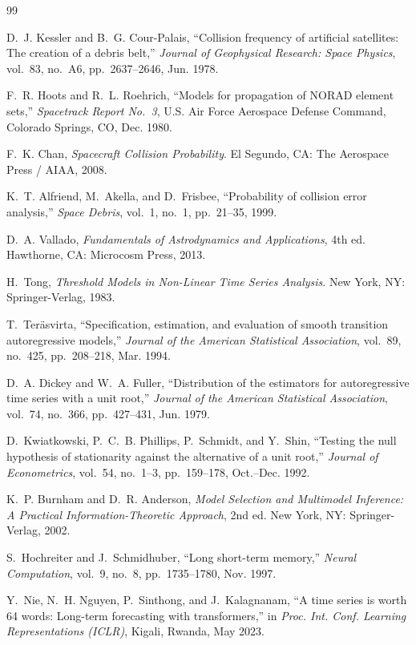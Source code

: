 \documentclass[conference]{IEEEtran}
\begin{document}
\begin{thebibliography}{99}

D.~J. Kessler and B.~G. Cour-Palais,
``Collision frequency of artificial satellites: The creation of a debris belt,''
\textit{Journal of Geophysical Research: Space Physics},
vol.~83, no.~A6, pp.~2637--2646, Jun. 1978.

F.~R. Hoots and R.~L. Roehrich,
``Models for propagation of NORAD element sets,''
\textit{Spacetrack Report No.~3}, U.S. Air Force Aerospace Defense Command,
Colorado Springs, CO, Dec. 1980.

F.~K. Chan,
\textit{Spacecraft Collision Probability}.
El Segundo, CA: The Aerospace Press / AIAA, 2008.

K.~T. Alfriend, M.~Akella, and D.~Frisbee,
``Probability of collision error analysis,''
\textit{Space Debris}, vol.~1, no.~1, pp.~21--35, 1999.

D.~A. Vallado,
\textit{Fundamentals of Astrodynamics and Applications}, 4th ed.
Hawthorne, CA: Microcosm Press, 2013.

H.~Tong,
\textit{Threshold Models in Non-Linear Time Series Analysis}.
New York, NY: Springer-Verlag, 1983.

T.~Ter\"{a}svirta,
``Specification, estimation, and evaluation of smooth transition autoregressive
models,''
\textit{Journal of the American Statistical Association},
vol.~89, no.~425, pp.~208--218, Mar. 1994.

D.~A. Dickey and W.~A. Fuller,
``Distribution of the estimators for autoregressive time series with a unit root,''
\textit{Journal of the American Statistical Association},
vol.~74, no.~366, pp.~427--431, Jun. 1979.

D.~Kwiatkowski, P.~C.~B. Phillips, P.~Schmidt, and Y.~Shin,
``Testing the null hypothesis of stationarity against the alternative of a unit root,''
\textit{Journal of Econometrics},
vol.~54, no.~1--3, pp.~159--178, Oct.--Dec. 1992.

K.~P. Burnham and D.~R. Anderson,
\textit{Model Selection and Multimodel Inference: A Practical
Information-Theoretic Approach}, 2nd ed.
New York, NY: Springer-Verlag, 2002.

S.~Hochreiter and J.~Schmidhuber,
``Long short-term memory,''
\textit{Neural Computation},
vol.~9, no.~8, pp.~1735--1780, Nov. 1997.

Y.~Nie, N.~H. Nguyen, P.~Sinthong, and J.~Kalagnanam,
``A time series is worth 64 words: Long-term forecasting with transformers,''
in \textit{Proc. Int. Conf. Learning Representations (ICLR)},
Kigali, Rwanda, May 2023.

\end{thebibliography}
\end{document}
